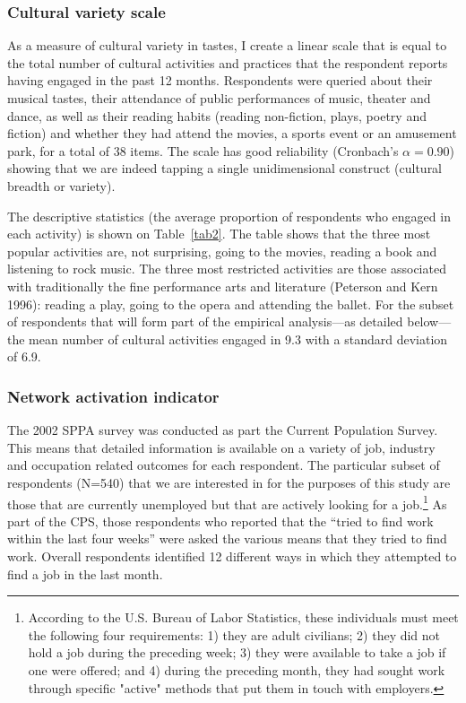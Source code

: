 \documentclass[12pt]{article}
\begin{document}
\subsubsection{Cultural variety scale}
As a measure of cultural variety in tastes, I create a linear scale that is equal to the total number of cultural activities and practices that the respondent reports having engaged in the past 12 months. Respondents were queried about their musical tastes, their attendance of public performances of music, theater and dance, as well as their reading habits (reading non-fiction, plays, poetry and fiction) and whether they had attend the movies, a sports event or an amusement park, for a total of 38 items. The scale has good reliability (Cronbach's $\alpha=0.90$) showing that we are indeed tapping a single unidimensional construct (cultural breadth or variety).

The descriptive statistics (the average proportion of respondents who engaged in each activity) is shown on Table~\ref{tab2}. The table shows that the three most popular activities are, not surprising, going to the movies, reading a book and listening to rock music. The three most restricted activities are those associated with traditionally the fine performance arts and literature (Peterson and Kern 1996): reading a play, going to the opera and attending the ballet. For the subset of respondents that will form part of the empirical analysis---as detailed below---the mean number of cultural activities engaged in 9.3 with a standard deviation of 6.9.

\subsubsection{Network activation indicator} 
The 2002 SPPA survey was conducted as part the Current Population Survey. This means that detailed information is available on a variety of job, industry and occupation related outcomes for each respondent. The particular subset of respondents (N=540) that we are interested in for the purposes of this study are those that are currently unemployed but that are actively looking for a job.\footnote{ According to the U.S. Bureau of Labor Statistics, these individuals must meet the following four requirements: 1) they are adult civilians; 2) they did not hold a job during the preceding week; 3) they were available to take a job if one were offered; and 4) during the preceding month, they had sought work through specific "active" methods that put them in touch with employers.} As part of the CPS, those respondents who reported that the ``tried to find work within the last four weeks'' were asked the various means that they tried to find work.   Overall respondents identified 12 different ways in which they attempted to find a job in the last month. 
\end{document}
